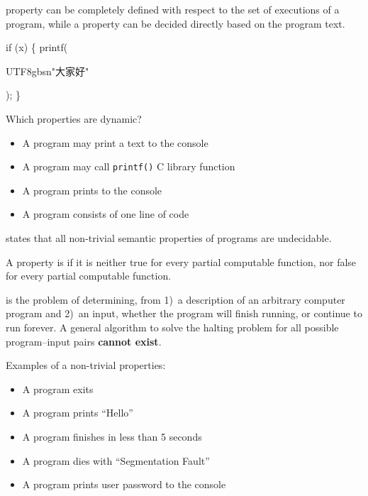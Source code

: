 \documentclass{article}
\begin{document}

\pptToc



 property can be completely defined with respect to the set of executions of a program,
while a  property can be decided directly based on the program text.

{\ttfamily if (x) \{ printf(\begin{CJK}{UTF8}{gbsn}"大家好"\end{CJK}); \}}

Which properties are dynamic?
\begin{itemize}\setlength\itemsep{0pt}
\item A program may print a text to the console
\item A program may call \texttt{printf()} C library function
\item A program prints to the console
\item A program consists of one line of code
\end{itemize}

\plush{}


 states that all non-trivial semantic properties of programs are undecidable.

A property is  if it is neither true for every partial computable function, nor false for every partial computable function.

 is the problem of determining, from 1)~a description of an arbitrary computer program and 2)~an input, whether the program will finish running, or continue to run forever. A general algorithm to solve the halting problem for all possible program–input pairs \textbf{cannot exist}.

\plush{}


Examples of a non-trivial properties:

\begin{itemize}\setlength\itemsep{0pt}
\item A program exits
\item A program prints ``Hello''
\item A program finishes in less than 5 seconds
\item A program dies with ``Segmentation Fault''
\item A program prints user password to the console
\end{itemize}
\end{document}
